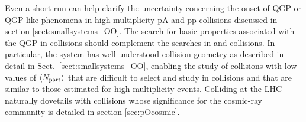 Even a short \OO run can help clarify the uncertainty concerning the onset of QGP or QGP-like phenomena in high-multiplicity pA and pp collisions discussed in section \ref{sect:smallsystems_OO}.  The search for basic properties associated with the QGP in \OO collisions should complement the searches in \pp and \pPb collisions.%
In particular, the \OO system has well-understood collision geometry as described in detail in Sect.~\ref{sect:smallsystems_OO}, enabling the study of collisions with low values of $\langle N_{\rm part}\rangle$ that are difficult to select and study in \PbPb collisions and that are similar to those estimated for high-multiplicity \pPb events. Colliding \OO at the LHC naturally dovetails with \pO collisions whose significance for the cosmic-ray community is detailed in section \ref{sec:pOcosmic}.

